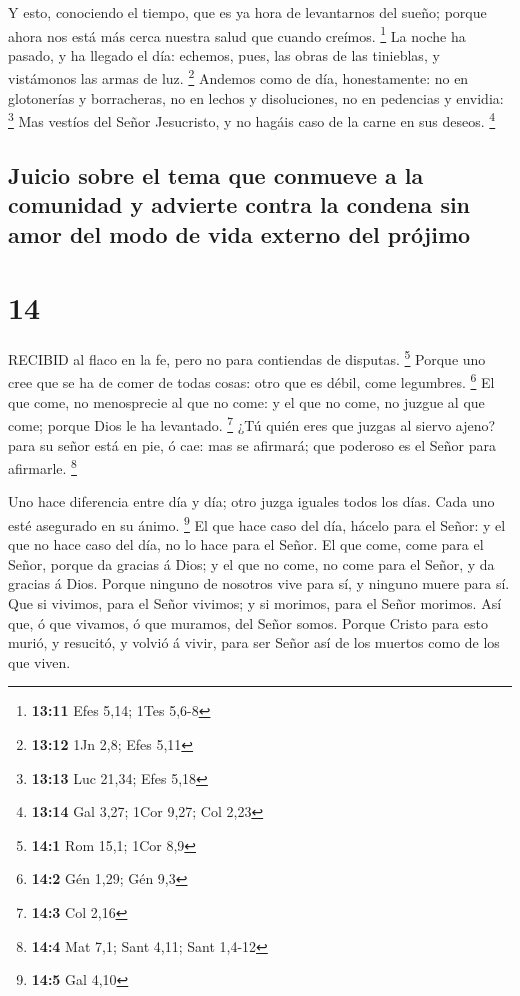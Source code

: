  Y esto, conociendo el tiempo, que es ya hora de
levantarnos del sueño; porque ahora nos está más cerca nuestra salud que
cuando creímos. \footnote{\textbf{13:11} Efes 5,14; 1Tes 5,6-8}
 La noche ha pasado, y ha llegado el día: echemos, pues,
las obras de las tinieblas, y vistámonos las armas de luz. \footnote{\textbf{13:12}
  1Jn 2,8; Efes 5,11}  Andemos como de día, honestamente:
no en glotonerías y borracheras, no en lechos y disoluciones, no en
pedencias y envidia: \footnote{\textbf{13:13} Luc 21,34; Efes 5,18}
 Mas vestíos del Señor Jesucristo, y no hagáis caso de la
carne en sus deseos. \footnote{\textbf{13:14} Gal 3,27; 1Cor 9,27; Col
  2,23}

\hypertarget{juicio-sobre-el-tema-que-conmueve-a-la-comunidad-y-advierte-contra-la-condena-sin-amor-del-modo-de-vida-externo-del-pruxf3jimo}{%
\subsection{Juicio sobre el tema que conmueve a la comunidad y advierte
contra la condena sin amor del modo de vida externo del
prójimo}\label{juicio-sobre-el-tema-que-conmueve-a-la-comunidad-y-advierte-contra-la-condena-sin-amor-del-modo-de-vida-externo-del-pruxf3jimo}}

\hypertarget{section-13}{%
\section{14}\label{section-13}}

 RECIBID al flaco en la fe, pero no para contiendas de
disputas. \footnote{\textbf{14:1} Rom 15,1; 1Cor 8,9} 
Porque uno cree que se ha de comer de todas cosas: otro que es débil,
come legumbres. \footnote{\textbf{14:2} Gén 1,29; Gén 9,3} 
El que come, no menosprecie al que no come: y el que no come, no juzgue
al que come; porque Dios le ha levantado. \footnote{\textbf{14:3} Col
  2,16}  ¿Tú quién eres que juzgas al siervo ajeno? para su
señor está en pie, ó cae: mas se afirmará; que poderoso es el Señor para
afirmarle. \footnote{\textbf{14:4} Mat 7,1; Sant 4,11; Sant 1,4-12}

 Uno hace diferencia entre día y día; otro juzga iguales
todos los días. Cada uno esté asegurado en su ánimo. \footnote{\textbf{14:5}
  Gal 4,10}  El que hace caso del día, hácelo para el Señor:
y el que no hace caso del día, no lo hace para el Señor. El que come,
come para el Señor, porque da gracias á Dios; y el que no come, no come
para el Señor, y da gracias á Dios.  Porque ninguno de
nosotros vive para sí, y ninguno muere para sí.  Que si
vivimos, para el Señor vivimos; y si morimos, para el Señor morimos. Así
que, ó que vivamos, ó que muramos, del Señor somos.  Porque
Cristo para esto murió, y resucitó, y volvió á vivir, para ser Señor así
de los muertos como de los que viven.

